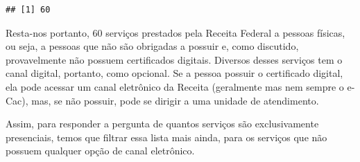 \documentclass[]{article}
\newenvironment{Shaded}{\begin{snugshade}}{\end{snugshade}}
\newcommand{\KeywordTok}[1]{\textcolor[rgb]{0.13,0.29,0.53}{\textbf{#1}}}
\newcommand{\NormalTok}[1]{#1}
\newcommand{\OperatorTok}[1]{\textcolor[rgb]{0.81,0.36,0.00}{\textbf{#1}}}
\newcommand{\StringTok}[1]{\textcolor[rgb]{0.31,0.60,0.02}{#1}}
\begin{document}
\begin{Shaded}
\end{Shaded}

\begin{verbatim}
## [1] 60
\end{verbatim}

Resta-nos portanto, 60 serviços prestados pela Receita Federal a pessoas
físicas, ou seja, a pessoas que não são obrigadas a possuir e, como
discutido, provavelmente não possuem certificados digitais. Diversos
desses serviços tem o canal digital, portanto, como opcional. Se a
pessoa possuir o certificado digital, ela pode acessar um canal
eletrônico da Receita (geralmente mas nem sempre o e-Cac), mas, se não
possuir, pode se dirigir a uma unidade de atendimento.

Assim, para responder a pergunta de quantos serviços são exclusivamente
presenciais, temos que filtrar essa lista mais ainda, para os serviços
que não possuem qualquer opção de canal eletrônico.
\end{document}
